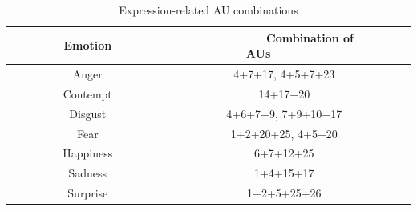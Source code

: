 \documentclass[10pt, conference, compsocconf]{IEEEtran}
\begin{document}
\begin{table}
	\caption{Expression-related AU combinations}
	\label{tab:freq}
	\begin{tabular}{ccl}
		\toprule
		\ \ \ \ \ \ \ \ Emotion\ \ \ \ \ \ \ \ & \ \ \ \ \ \ \ \ Combination of AUs\ \ \ \ \ \ \ \ \\
		\midrule
		Anger & 4+7+17, 4+5+7+23\\
		Contempt &14+17+20\\
		Disgust & 4+6+7+9, 7+9+10+17\\
		Fear & 1+2+20+25, 4+5+20\\
		Happiness & 6+7+12+25\\
		Sadness &1+4+15+17\\
		Surprise & 1+2+5+25+26\\
		\bottomrule
	\end{tabular}
\end{table}
\end{document}
